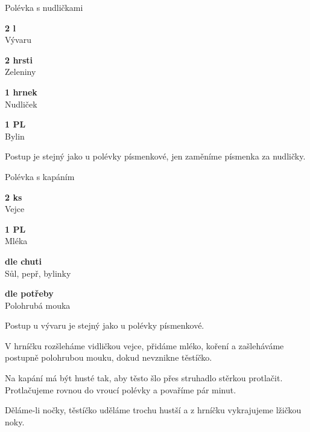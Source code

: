 \documentclass[11pt,a4paper]{article}
\begin{document}
\begin{recipe}[ForestGreen]{Polévka s nudličkami}
    \begin{ingredients}
        \item \parbox[t]{\linewidth}{\raggedright \liquid \textbf{2 l}\\ Vývaru}
        \item \parbox[t]{\linewidth}{\raggedright \indefinite \textbf{2 hrsti}\\ Zeleniny}
        \item \parbox[t]{\linewidth}{\raggedright \piece \textbf{1 hrnek}\\ Nudliček}
        \item \parbox[t]{\linewidth}{\raggedright \spoon \textbf{1 PL}\\ Bylin}
    \end{ingredients}
    \begin{steps}
        \item Postup je stejný jako u polévky písmenkové, jen zaměníme písmenka za nudličky.
    \end{steps}
\end{recipe}

\begin{recipe}[ForestGreen]{Polévka s kapáním}
    \begin{ingredients}
        \item \parbox[t]{\linewidth}{\raggedright \piece \textbf{2 ks}\\ Vejce}
        \item \parbox[t]{\linewidth}{\raggedright \spoon \textbf{1 PL}\\ Mléka}
        \item \parbox[t]{\linewidth}{\raggedright \indefinite \textbf{dle chuti}\\ Sůl, pepř, bylinky}
        \item \parbox[t]{\linewidth}{\raggedright \weight \textbf{dle potřeby}\\ Polohrubá mouka}
    \end{ingredients}
    \begin{steps}
        \item Postup u vývaru je stejný jako u polévky písmenkové.
        \item V hrníčku rozšleháme vidličkou vejce, přidáme mléko, koření a zašleháváme postupně polohrubou mouku, dokud nevznikne těstíčko. 
        \item Na kapání má být husté tak, aby těsto šlo přes struhadlo stěrkou protlačit. Protlačujeme rovnou do vroucí polévky a povaříme pár minut.
        \item Děláme-li nočky, těstíčko uděláme trochu hustší a z hrníčku vykrajujeme lžičkou noky.
    \end{steps}
\end{recipe}
\end{document}
